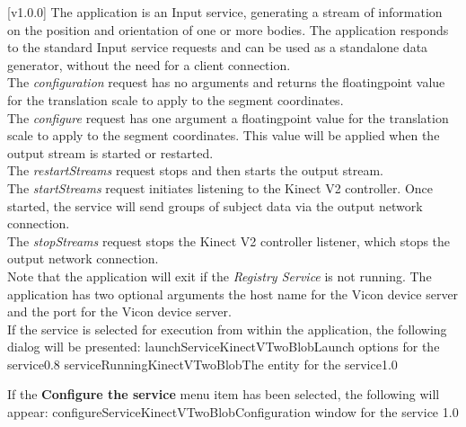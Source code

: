 [v1.0.0]
The  application is an Input service,
generating a stream of information on the position and orientation of one or more bodies.
The application responds to the standard Input service requests and can be used as a
standalone data generator, without the need for a client connection.\\

The \emph{configuration} request has no arguments and returns the floating\longDash{}point
value for the translation scale to apply to the segment coordinates.\\

The \emph{configure} request has one argument \longDash{} a floating\longDash{}point
value for the translation scale to apply to the segment coordinates.
This value will be applied when the output stream is started or restarted.\\ 

The \emph{restartStreams} request stops and then starts the output stream.\\

The \emph{startStreams} request initiates listening to the Kinect V2 controller.
Once started, the service will send groups of subject data via the output \yarp{} network
connection.\\

The \emph{stopStreams} request stops the Kinect V2 controller listener, which stops the
output \yarp{} network connection.\\ 

Note that the application will exit if the \emph{Registry Service} is not running.
The application has two optional arguments \longDash{} the host name for the Vicon device
server and the port for the Vicon device server.
\insertAppParameters
\condPage
\insertTagDescription{\KVtwoBI}
\insertInputServiceComment\\

\insertStandardServiceCommands
\secondaryEnd
{}
If the service is selected for execution from within the \emph{\MMMU} application, the
following dialog will be presented:
%
{launchServiceKinectVTwoBlob}{Launch options for the \KVtwoBI{} service}{0.8}
\condPage
{}%
{serviceRunningKinectVTwoBlob}{The \emph{\MMMU} entity for the \KVtwoBI{} service}{1.0}

If the \textbf{Configure the service} menu item has been selected, the following will
appear:
%
{configureServiceKinectVTwoBlob}{Configuration window for the \emph{\KVtwoBI} service}%
{1.0}
\secondaryEnd
\primaryEnd{}
